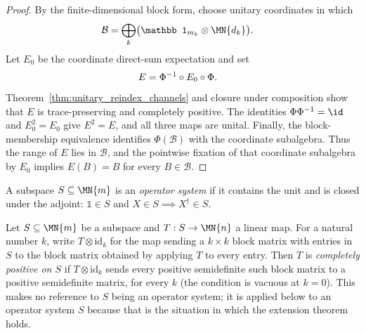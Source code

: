 \begin{proof}\leanok
    By the finite-dimensional block form, choose unitary coordinates in
    which
    \begin{align}
        \mathcal B
        &=\bigoplus_k\bigl(\mathbb1_{m_k}\otimes\MN{d_k}\bigr).
        \notag
    \end{align}
    Let $E_0$ be the coordinate direct-sum expectation and set
    \begin{align}
        E&=\Phi^{-1}\circ E_0\circ\Phi.
        \notag
    \end{align}
    Theorem~\ref{thm:unitary_reindex_channels} and closure under composition
    show that $E$ is trace-preserving and completely positive. The identities
    $\Phi\Phi^{-1}=\id$ and $E_0^2=E_0$ give $E^2=E$, and all three maps are
    unital. Finally, the block-membership equivalence identifies
    $\Phi(\mathcal B)$ with the coordinate subalgebra. Thus the range of $E$
    lies in $\mathcal B$, and the pointwise fixation of that coordinate
    subalgebra by $E_0$ implies $E(B)=B$ for every $B\in\mathcal B$.
\end{proof}

\begin{definition}\label{def:operator_system}
    \leanok
    A subspace $S\subseteq\MN{m}$ is an \emph{operator system} if it
    contains the unit and is closed under the adjoint: $\mathbb 1\in S$ and
    $X\in S\implies X^\dagger\in S$.
\end{definition}

\begin{definition}
    \label{def:cp_on_operator_system}
    \leanok
    Let $S\subseteq\MN{m}$ be a subspace and $T:S\to\MN{n}$ a linear map.
    For a natural number $k$, write $T\otimes\mathrm{id}_k$ for the map
    sending a $k\times k$ block matrix with entries in $S$ to the block
    matrix obtained by applying $T$ to every entry. Then $T$ is \emph{completely
    positive on $S$} if $T\otimes\mathrm{id}_k$ sends every positive
    semidefinite such block matrix to a positive semidefinite matrix, for
    every $k$ (the condition is vacuous at $k=0$). This makes no reference
    to $S$ being an operator system; it is applied below to an operator
    system $S$ because that is the situation in which the extension
    theorem holds.
\end{definition}

